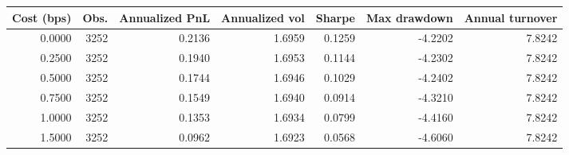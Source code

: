\begin{tabular}{rrrrrrr}
\toprule
Cost (bps) & Obs. & Annualized PnL & Annualized vol & Sharpe & Max drawdown & Annual turnover \\
\midrule
0.0000 & 3252 & 0.2136 & 1.6959 & 0.1259 & -4.2202 & 7.8242 \\
0.2500 & 3252 & 0.1940 & 1.6953 & 0.1144 & -4.2302 & 7.8242 \\
0.5000 & 3252 & 0.1744 & 1.6946 & 0.1029 & -4.2402 & 7.8242 \\
0.7500 & 3252 & 0.1549 & 1.6940 & 0.0914 & -4.3210 & 7.8242 \\
1.0000 & 3252 & 0.1353 & 1.6934 & 0.0799 & -4.4160 & 7.8242 \\
1.5000 & 3252 & 0.0962 & 1.6923 & 0.0568 & -4.6060 & 7.8242 \\
\bottomrule
\end{tabular}
